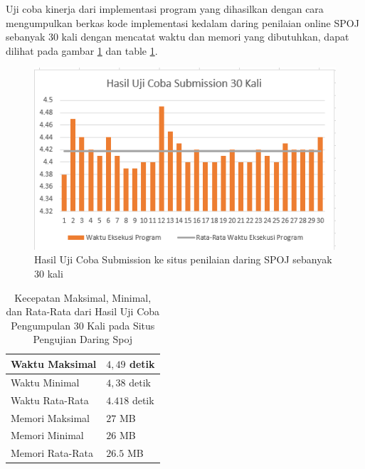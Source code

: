 Uji coba kinerja dari implementasi program yang dihasilkan dengan cara mengumpulkan berkas kode implementasi kedalam daring penilaian online SPOJ sebanyak 30 kali dengan mencatat waktu dan memori yang dibutuhkan, dapat dilihat pada gambar \ref{fig:asf} dan table \ref{tab:statistik}.
\begin{figure}[H]
\centering
\includegraphics[scale=0.4]{images/uji31.png}
\caption{Hasil Uji Coba Submission ke situs penilaian daring SPOJ sebanyak 30 kali}
\label{fig:asf}
\end{figure}
\begin{table}[H]
	\centering
	\caption{Kecepatan Maksimal, Minimal, dan Rata-Rata dari Hasil Uji Coba Pengumpulan 30 Kali pada Situs Pengujian Daring Spoj}	
	\begin{tabular}{|l|l|} \hline
		Waktu Maksimal & $ 4,49 $ detik\\ \hline
		Waktu Minimal & $ 4,38 $ detik\\ \hline
		Waktu Rata-Rata & $ 4.418 $ detik\\ \hline
		Memori Maksimal & $ 27 $ MB\\ \hline
		Memori Minimal & $ 26 $ MB\\ \hline
		Memori Rata-Rata & $ 26.5 $ MB\\ \hline
	\end{tabular}
	
	\label{tab:statistik}
\end{table}


